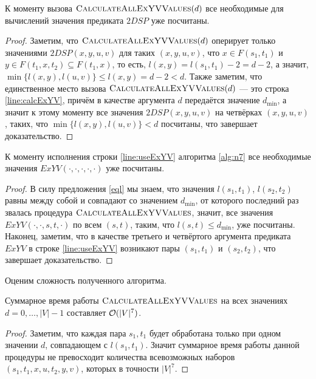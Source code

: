 \begin{proposition}
К моменту вызова $\textsc{CalculateAllExYVValues}(d)$ все необходимые для вычислений значения предиката $2DSP$ уже посчитаны.
\end{proposition}
\begin{proof}
Заметим, что $\textsc{CalculateAllExYVValues}(d)$ оперирует только значениями $2DSP(x, y, u, v)$ для таких $(x, y, u, v)$, что $x \in F(s_1, t_1)$ и $y \in F(t_1,x,t_2) \subseteq F(t_1,x)$, то есть, $l(x, y) = l(s_1, t_1) - 2 = d - 2$, а значит, $\min\{l(x, y), l(u, v)\} \leq l(x, y) = d - 2 < d$. Также заметим, что единственное место вызова $\textsc{CalculateAllExYVValues}(d)$ --- это строка \ref{line:calcExYV}, причём в качестве аргумента $d$ передаётся значение $d_{\min}$, а значит к этому моменту все значения $2DSP(x, y, u, v)$ на четвёрках $(x, y, u, v)$, таких, что $\min\{l(x, y), l(u, v)\} < d$ посчитаны, что завершает доказательство. 
\end{proof}

\begin{proposition}
К моменту исполнения строки \ref{line:useExYV} алгоритма \ref{alg:n7} все необходимые значения $ExYV(\cdot, \cdot, \cdot, \cdot, \cdot)$ уже посчитаны.
\end{proposition}
\begin{proof}
В силу предложения \ref{eql} мы знаем, что значения $l(s_1, t_1)$, $l(s_2, t_2)$ равны между собой и совпадают со значением $d_{\min}$, от которого последний раз звалась процедура $\textsc{CalculateAllExYVValues}$, значит, все значения $ExYV(\cdot, \cdot, s, t, \cdot)$ по всем $(s, t)$, таким, что $l(s, t) \leq d_{\min}$, уже посчитаны. Наконец, заметим, что в качестве третьего и четвёртого аргумента предиката $ExYV$ в строке \ref{line:useExYV} возникают пары $(s_1, t_1)$ и $(s_2, t_2)$, что завершает доказательство.
\end{proof}

Оценим сложность полученного алгоритма.

\begin{proposition}
Суммарное время работы $\textsc{CalculateAllExYVValues}$ на всех значениях $d = 0, \ldots, |V|-1$ составляет $\mathcal{O}(|V|^7)$. 
\end{proposition}
\begin{proof}
Заметим, что каждая пара $s_1, t_1$ будет обработана только при одном значении $d$, совпадающем с $l(s_1, t_1)$. Значит суммарное время работы данной процедуры не превосходит количества всевозможных наборов $(s_1, t_1, x, u, t_2, y, v)$, которых в точности $|V|^7$.
\end{proof}

